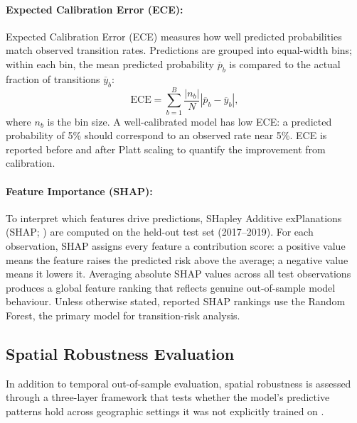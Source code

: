 \documentclass[12pt]{article}
\theoremstyle{break}
\begin{document}
\paragraph{Expected Calibration Error (ECE):}
Expected Calibration Error (ECE) \citep{guo2017} measures how well predicted
probabilities match observed transition rates.
Predictions are grouped into equal-width bins; within each bin, the mean predicted
probability $\overline{p}_b$ is compared to the actual fraction of transitions
$\overline{y}_b$:
\begin{equation}
  \text{ECE} = \sum_{b=1}^{B} \frac{|n_b|}{N}
    \left| \overline{p}_b - \overline{y}_b \right|,
\end{equation}
where $n_b$ is the bin size. A well-calibrated model has low ECE: a predicted
probability of 5\% should correspond to an observed rate near 5\%. ECE is reported
before and after Platt scaling to quantify the improvement from calibration.

\paragraph{Feature Importance (SHAP):}
\label{sec:shap_methods}

To interpret which features drive predictions, SHapley Additive exPlanations
(SHAP; \citealp{lundberg2017}) are computed on the held-out test set (2017--2019).
For each observation, SHAP assigns every feature a contribution score: a positive
value means the feature raises the predicted risk above the average; a negative value
means it lowers it. Averaging absolute SHAP values across all test observations
produces a global feature ranking that reflects genuine out-of-sample model behaviour.
Unless otherwise stated, reported SHAP rankings use the Random Forest, the primary
model for transition-risk analysis.

\subsection{Spatial Robustness Evaluation}
\label{sec:spatial_cv}

In addition to temporal out-of-sample evaluation, spatial robustness is assessed
through a three-layer framework that tests whether the model's predictive patterns
hold across geographic settings it was not explicitly trained on \citep{ploton2020}.
\end{document}
